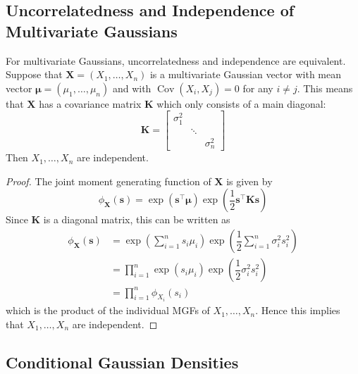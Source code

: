 \documentclass[11pt]{report} %
\begin{document}
\subsection{Uncorrelatedness and Independence of Multivariate Gaussians}

For multivariate Gaussians, uncorrelatedness and independence are equivalent. Suppose that $\mathbf{X} = \left(X_{1}, \dots, X_{n}\right)$ is a multivariate Gaussian vector with mean vector $\boldsymbol{\mu} = \left(\mu_{1}, \dots, \mu_{n}\right)$ and with $\operatorname{Cov}\left(X_{i}, X_{j}\right) = 0$ for any $i \neq j$. This means that $\mathbf{X}$ has a covariance matrix $\mathbf{K}$ which only consists of a main diagonal:
\begin{equation}
\mathbf{K} = \begin{bmatrix}\sigma_{1}^{2} \\ & \ddots \\ & & \sigma_{n}^{2}\end{bmatrix}
\end{equation}
Then $X_{1}, \dots, X_{n}$ are independent.
\begin{proof}
The joint moment generating function of $\mathbf{X}$ is given by
\begin{equation}
\phi_{\mathbf{X}}\left(\mathbf{s}\right) = \exp\left(\mathbf{s}^{\top}\boldsymbol{\mu}\right)\exp\left(\dfrac{1}{2}\mathbf{s}^{\top}\mathbf{K}\mathbf{s}\right)
\end{equation}
Since $\mathbf{K}$ is a diagonal matrix, this can be written as
\begin{align}
\phi_{\mathbf{X}}\left(\mathbf{s}\right) &= \exp\left(\sum_{i = 1}^{n}s_{i}\mu_{i}\right)\exp\left(\dfrac{1}{2}\sum_{i = 1}^{n}\sigma_{i}^{2}s_{i}^{2}\right) \\
&= \prod_{i = 1}^{n}\exp\left(s_{i}\mu_{i}\right)\exp\left(\dfrac{1}{2}\sigma_{i}^{2}s_{i}^{2}\right) \\
&= \prod_{i = 1}^{n}\phi_{X_{i}}\left(s_{i}\right)
\end{align}
which is the product of the individual MGFs of $X_{1}, \dots, X_{n}$. Hence this implies that $X_{1}, \dots, X_{n}$ are independent.
\end{proof}

\subsection{Conditional Gaussian Densities}
\end{document}
